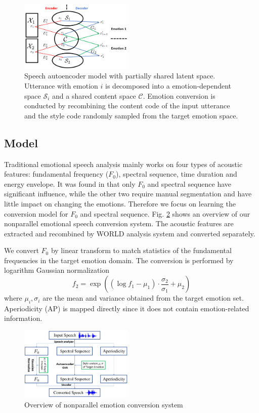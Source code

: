 \documentclass{article}
\begin{document}
\begin{figure}[htb]
\includegraphics[width=0.48\textwidth]{FIG/autoencoder}
\caption{Speech autoencoder model with partially shared latent space. Utterance with emotion $i$ is decomposed into a emotion-dependent space $\mathcal{S}_i$ and a shared content space $\mathcal{C}$. Emotion conversion is conducted by recombining the content code of the input utterance and the style code randomly sampled from the target emotion space.}
\label{autoencoder}
\end{figure}


\subsection{Model}
Traditional emotional speech analysis mainly works on four types of acoustic features: fundamental frequency ($F_0$), spectral sequence, time duration and energy envelope. It was found in \cite{xue2018voice} that only $F_0$ and spectral sequence have significant influence, while the other two require manual segmentation and have little impact on changing the emotions. Therefore we focus on learning the conversion model for $F_0$ and spectral sequence. Fig. \ref{model} shows an overview of our nonparallel emotional speech conversion system. The acoustic features are extracted and recombined by WORLD analysis system \cite{morise2016world} and converted separately.

We convert $F_0$ by linear transform to match statistics of the fundamental frequencies in the target emotion domain. The conversion is performed by logarithm Gaussian normalization
\begin{equation}
f_2 = \exp((\log f_1 - \mu_1)\cdot\frac{\sigma_2}{\sigma_1} + \mu_2)
\label{eq:f0}
\end{equation}
where $\mu_i, \sigma_i$ are the mean and variance obtained from the target emotion set. Aperiodicity (AP) is mapped directly since it does not contain emotion-related information.

\begin{figure}[htb]
\includegraphics[width=0.48\textwidth]{FIG/model}
\caption{Overview of nonparallel emotion conversion system}
\label{model}
\end{figure}
\end{document}
